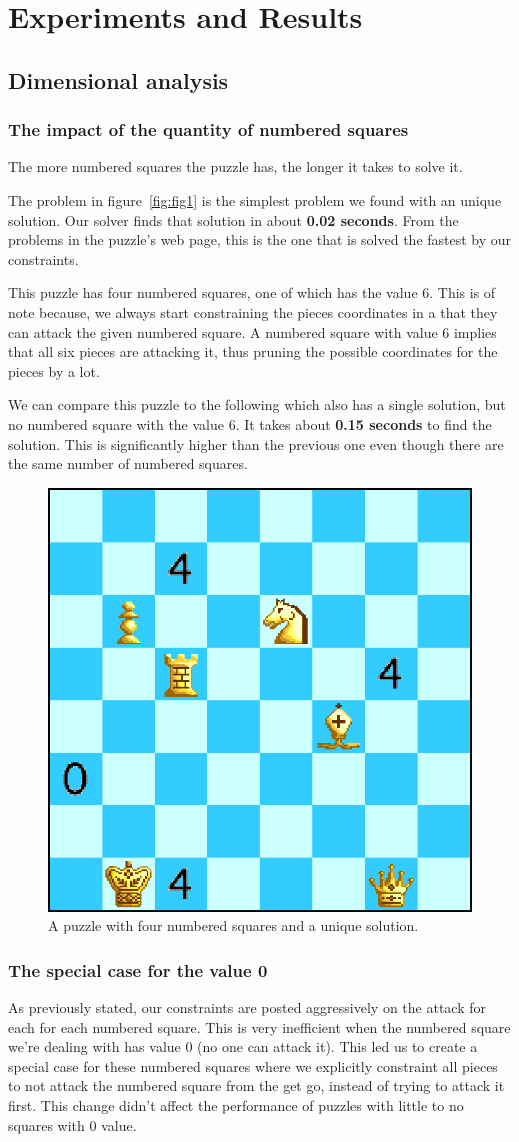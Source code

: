 \documentclass[runningheads]{llncs}
\begin{document}
\section{Experiments and Results}
\subsection{Dimensional analysis}
\subsubsection{The impact of the quantity of numbered squares}
The more numbered squares the puzzle has, the longer it takes to solve it.

The problem in figure~\ref{fig:fig1} is the simplest problem we found with
an unique solution. Our solver finds that solution in about \textbf{0.02 seconds}.
From the problems in the puzzle's web page, this is the one that is solved
the fastest by our constraints.

This puzzle has four numbered squares, one of which has the value 6. This
is of note because, we always start constraining the pieces coordinates
in a that they can attack the given numbered square. A numbered square with
value 6 implies that all six pieces are attacking it, thus pruning the
possible coordinates for the pieces by a lot.

We can compare this puzzle to the following which also has a single solution,
but no numbered square with the value 6. It takes about \textbf{0.15 seconds} to
find the solution. This is significantly higher than the previous one
even though there are the same number of numbered squares.

\begin{figure}[H]
  \centering
  \includegraphics[width=0.4\linewidth]{figures/chess2.eps}
  \caption{A puzzle with four numbered squares and a unique solution.}\label{fig:fig5}
\end{figure}

\subsubsection{The special case for the value 0}
As previously stated, our constraints are posted aggressively on the attack
for each for each numbered square. This is very inefficient when the numbered
square we're dealing with has value 0 (no one can attack it). This led us to
create a special case for these numbered squares where we explicitly constraint
all pieces to not attack the numbered square from the get go, instead of
trying to attack it first. This change didn't affect the performance of puzzles
with little to no squares with 0 value.
\end{document}
